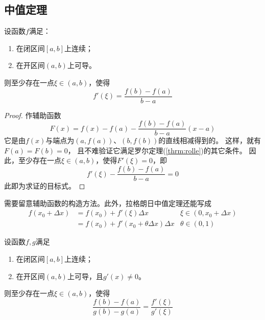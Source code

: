 \subsection{中值定理}
\begin{theorem} \label{thrm-lagrange-mean-value}
  设函数$f$满足：
  \begin{enumerate}
    \item
    在闭区间$[a,b]$上连续；
    \item
    在开区间$(a,b)$上可导。
  \end{enumerate}
  则至少存在一点$\xi\in(a,b)$，使得
  \begin{displaymath}
    f'(\xi)=\frac{f(b)-f(a)}{b-a}
  \end{displaymath}
\end{theorem}

\begin{proof}
  作辅助函数
  \begin{displaymath}
    F(x) = f(x)-f(a)-\frac{f(b)-f(a)}{b-a}(x-a)
  \end{displaymath}
  它是由$f(x)$与端点为$(a,f(a))$、$(b,f(b))$的直线相减得到的。
  这样，就有$F(a)=F(b)=0$，
  且不难验证它满足罗尔定理(\ref{thrm:rolle})的其它条件。
  因此，至少存在一点$\xi\in(a,b)$，使得$F'(\xi)=0$，即
  \begin{displaymath}
    f'(\xi)-\frac{f(b)-f(a)}{b-a} = 0
  \end{displaymath}
  此即为求证的目标式。
\end{proof}

\begin{remark}
  需要留意辅助函数的构造方法。此外，拉格朗日中值定理还能写成
  \begin{align*}
    f(x_0 + \Delta x)
    &= f(x_0) + f'(\xi)\Delta x &\xi\in(0,x_0+\Delta x)\\
    &= f(x_0) + f'(x_0+\theta \Delta x)\Delta x &\theta\in(0,1)
  \end{align*}
\end{remark}

\begin{theorem} \label{thrm:cauchy-mean-value}
  设函数$f,g$满足
  \begin{enumerate}
     \item
    在闭区间$[a,b]$上连续；
    \item
    在开区间$(a,b)$上可导，且$g'(x)\neq 0$。
  \end{enumerate}
  则至少存在一点$\xi\in(a,b)$，使得
  \begin{displaymath}
    \frac{f(b)-f(a)}{g(b)-g(a)}=\frac{f'(\xi)}{g'(\xi)}
  \end{displaymath}
\end{theorem}

